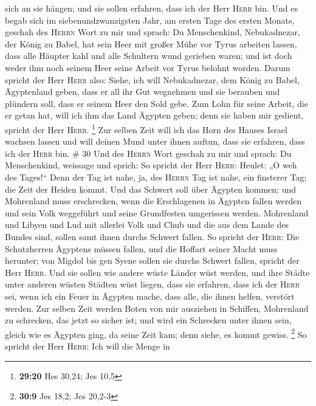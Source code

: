 sich an sie hängen; und sie sollen erfahren, dass ich der Herr
\textsc{Herr} bin.  Und es begab sich im
siebenundzwanzigsten Jahr, am ersten Tage des ersten Monats, geschah des
\textsc{Herrn} Wort zu mir und sprach:  Du Menschenkind,
Nebukadnezar, der König zu Babel, hat sein Heer mit großer Mühe vor
Tyrus arbeiten lassen, dass alle Häupter kahl und alle Schultern wund
gerieben waren; und ist doch weder ihm noch seinem Heer seine Arbeit vor
Tyrus belohnt worden.  Darum spricht der Herr
\textsc{Herr} also: Siehe, ich will Nebukadnezar, dem König zu Babel,
Ägyptenland geben, dass er all ihr Gut wegnehmen und sie berauben und
plündern soll, dass er seinem Heer den Sold gebe.  Zum
Lohn für seine Arbeit, die er getan hat, will ich ihm das Land Ägypten
geben; denn sie haben mir gedient, spricht der Herr \textsc{Herr}.
\footnote{\textbf{29:20} Hes 30,24; Jes 10,5}  Zur selben
Zeit will ich das Horn des Hauses Israel wachsen lassen und will deinen
Mund unter ihnen auftun, dass sie erfahren, dass ich der \textsc{Herr}
bin. \# 30  Und des \textsc{Herrn} Wort geschah zu mir und
sprach:  Du Menschenkind, weissage und sprich: So spricht
der Herr \textsc{Herr}: Heulet: „O weh des Tages!{}`` 
Denn der Tag ist nahe, ja, des \textsc{Herrn} Tag ist nahe, ein
finsterer Tag; die Zeit der Heiden kommt.  Und das Schwert
soll über Ägypten kommen; und Mohrenland muss erschrecken, wenn die
Erschlagenen in Ägypten fallen werden und sein Volk weggeführt und seine
Grundfesten umgerissen werden.  Mohrenland und Libyen und
Lud mit allerlei Volk und Chub und die aus dem Lande des Bundes sind,
sollen samt ihnen durchs Schwert fallen.  So spricht der
\textsc{Herr}: Die Schutzherren Ägyptens müssen fallen, und die Hoffart
seiner Macht muss herunter; von Migdol bis gen Syene sollen sie durchs
Schwert fallen, spricht der Herr \textsc{Herr}.  Und sie
sollen wie andere wüste Länder wüst werden, und ihre Städte unter
anderen wüsten Städten wüst liegen,  dass sie erfahren,
dass ich der \textsc{Herr} sei, wenn ich ein Feuer in Ägypten mache,
dass alle, die ihnen helfen, verstört werden.  Zur selben
Zeit werden Boten von mir ausziehen in Schiffen, Mohrenland zu
schrecken, das jetzt so sicher ist; und wird ein Schrecken unter ihnen
sein, gleich wie es Ägypten ging, da seine Zeit kam; denn siehe, es
kommt gewiss. \footnote{\textbf{30:9} Jes 18,2; Jes 20,2-3}
 So spricht der Herr \textsc{Herr}: Ich will die Menge in
